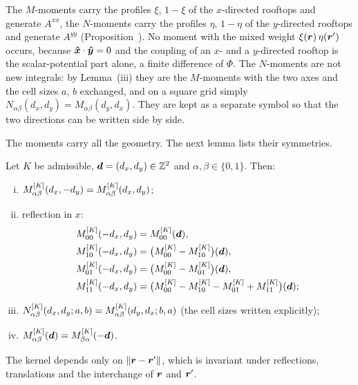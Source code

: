 The $M$-moments carry the profiles $\xi$, $1-\xi$ of the $x$-directed rooftops and generate $A^{xx}$, the $N$-moments
carry the profiles $\eta$, $1-\eta$ of the $y$-directed rooftops and generate $A^{yy}$
(Proposition~). No moment with the mixed weight $\xi(\vb*{r})\,\eta(\vb*{r}')$ occurs, because
$\vb*{\hat{x}}\cdot\vb*{\hat{y}}=0$ and the coupling of an $x$- and a $y$-directed rooftop is the scalar-potential part alone, a
finite difference of $\Phi$. The $N$-moments are not new integrals: by Lemma~(iii) they are the
$M$-moments with the two axes and the cell sizes $a$, $b$ exchanged, and on a square grid simply
$N_{\alpha\beta}(d_x,d_y)=M_{\alpha\beta}(d_y,d_x)$. They are kept as a separate symbol so that the two directions can
be written side by side.

\vspace{\baselineskip}
The moments carry all the geometry. The next lemma lists their symmetries.

 Let $K$ be admissible, $\vb*{d}=(d_x,d_y)\in\mathbb{Z}^2$ and
$\alpha,\beta\in\{0,1\}$. Then:
\begin{enumerate}[(i)]
    \item $M^{[K]}_{\alpha\beta}(d_x,-d_y) = M^{[K]}_{\alpha\beta}(d_x,d_y)$;
    \item reflection in $x$:
    \begin{equation}
    \begin{aligned}
        M^{[K]}_{00}(-d_x,d_y) &= M^{[K]}_{00}(\vb*{d}), \\
        M^{[K]}_{10}(-d_x,d_y) &= \bigl(M^{[K]}_{00}-M^{[K]}_{10}\bigr)(\vb*{d}),\\
        M^{[K]}_{01}(-d_x,d_y) &= \bigl(M^{[K]}_{00}-M^{[K]}_{01}\bigr)(\vb*{d}), \\
        M^{[K]}_{11}(-d_x,d_y) &= \bigl(M^{[K]}_{00}-M^{[K]}_{10}-M^{[K]}_{01}+M^{[K]}_{11}\bigr)(\vb*{d});
        \end{aligned}
\end{equation}
    \item $N^{[K]}_{\alpha\beta}(d_x,d_y;a,b) = M^{[K]}_{\alpha\beta}(d_y,d_x;b,a)$ (the cell sizes written explicitly);
    \item $M^{[K]}_{\alpha\beta}(\vb*{d}) = M^{[K]}_{\beta\alpha}(-\vb*{d})$.
\end{enumerate}

\vspace{\baselineskip}
\proof
The kernel depends only on $\left\| \vb*{r}-\vb*{r}' \right\|$, which is invariant under reflections, translations and the interchange
of $\vb*{r}$ and $\vb*{r}'$.

